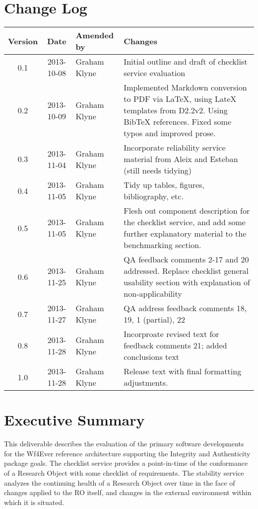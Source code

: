 \documentclass[a4paper, twoside, 11pt]{article}
\begin{document}
\section*{Change Log}
\begin{centering}

\begin{tabular}{|c|c|p{4.92cm}|p{6.5cm}|}

\hline \textbf{Version} & \textbf{Date} & \textbf{Amended by} & \textbf{Changes} \\ \hline
0.1 & 2013-10-08 & Graham Klyne & Initial outline and draft of checklist service evaluation \\ \hline
0.2 & 2013-10-09 & Graham Klyne & Implemented Markdown conversion to PDF via LaTeX, using LateX templates from D2.2v2.  Using BibTeX references.  Fixed some typos and improved prose. \\ \hline
0.3 & 2013-11-04 & Graham Klyne & Incorporate reliability service material from Aleix and Esteban (still needs tidying) \\ \hline
0.4 & 2013-11-05 & Graham Klyne & Tidy up tables, figures, bibliography, etc. \\ \hline
0.5 & 2013-11-05 & Graham Klyne & Flesh out component description for the checklist service, and add some further explanatory material to the benchmarking section. \\ \hline
0.6 & 2013-11-25 & Graham Klyne & QA feedback comments 2-17 and 20 addressed. Replace checklist general usability section with explanation of non-applicability \\ \hline
0.7 & 2013-11-27 & Graham Klyne & QA address feedback comments 18, 19, 1 (partial), 22 \\ \hline
0.8 & 2013-11-28 & Graham Klyne & Incorproate revised text for feedback comments 21; added conclusions text \\ \hline
1.0 & 2013-11-28 & Graham Klyne & Release text with final formatting adjustments. \\ \hline



\end{tabular}

\end{centering}
\clearpage

\section*{Executive Summary}
This deliverable describes the evaluation of the primary software developments for the Wf4Ever reference architecture supporting the Integrity and Authenticity package goals.  The checklist service provides a point-in-time of the conformance of a Research Object with some checklist of requirements.  The stability service analyzes the continuing health of a Research Object over time in the face of changes applied to the RO itself, and changes in the external environment within which it is situated.
\end{document}
